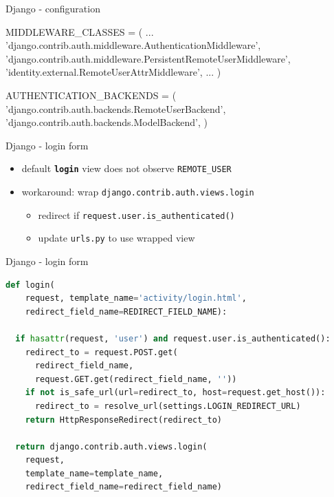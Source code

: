 \documentclass[ignorenonframetext,aspectratio=169]{beamer}
\newenvironment{Shaded}{}{}
\newcommand{\StringTok}[1]{\textcolor[rgb]{0.25,0.44,0.63}{{#1}}}
\newcommand{\OperatorTok}[1]{\textcolor[rgb]{0.40,0.40,0.40}{{#1}}}
\newcommand{\NormalTok}[1]{{#1}}
\providecommand{\tightlist}{%
  \setlength{\itemsep}{0pt}\setlength{\parskip}{0pt}}
\begin{document}
\begin{frame}[fragile]{Django - configuration}
\begin{Shaded}
\begin{Highlighting}[]
\NormalTok{MIDDLEWARE_CLASSES }\OperatorTok{=} \NormalTok{(}
 \NormalTok{...}
 \StringTok{'django.contrib.auth.middleware.AuthenticationMiddleware'}\NormalTok{,}
 \StringTok{'django.contrib.auth.middleware.PersistentRemoteUserMiddleware'}\NormalTok{,}
 \StringTok{'identity.external.RemoteUserAttrMiddleware'}\NormalTok{,}
 \NormalTok{...}
\NormalTok{)}

\NormalTok{AUTHENTICATION_BACKENDS }\OperatorTok{=} \NormalTok{(}
  \StringTok{'django.contrib.auth.backends.RemoteUserBackend'}\NormalTok{,}
  \StringTok{'django.contrib.auth.backends.ModelBackend'}\NormalTok{,}
\NormalTok{)}
\end{Highlighting}
\end{Shaded}
\end{frame}

\begin{frame}{Django - login form}
\begin{itemize}
\tightlist

\item default {\tt \textbf{login}} view does not observe {\tt REMOTE\_USER}

\item workaround: wrap {\tt django.contrib.auth.views.login}

    \begin{itemize}
    \tightlist
    \item redirect if {\tt request.user.is\_authenticated()}
    \item update {\tt urls.py} to use wrapped view
    \end{itemize}

\end{itemize}
\end{frame}

\begin{frame}[fragile]{Django - login form}
\begin{lstlisting}[language=Python]
def login(
    request, template_name='activity/login.html',
    redirect_field_name=REDIRECT_FIELD_NAME):

  if hasattr(request, 'user') and request.user.is_authenticated():
    redirect_to = request.POST.get(
      redirect_field_name,
      request.GET.get(redirect_field_name, ''))
    if not is_safe_url(url=redirect_to, host=request.get_host()):
      redirect_to = resolve_url(settings.LOGIN_REDIRECT_URL)
    return HttpResponseRedirect(redirect_to)

  return django.contrib.auth.views.login(
    request,
    template_name=template_name,
    redirect_field_name=redirect_field_name)
\end{lstlisting}
\end{frame}
\end{document}
